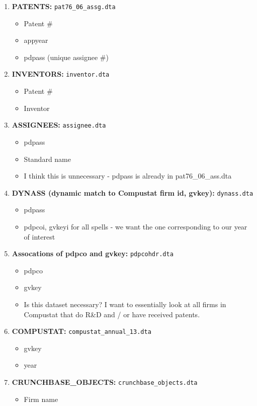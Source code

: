 \documentclass[12pt,english]{article}
\theoremstyle{remark}
\begin{document}
\begin{enumerate}
	\item \textbf{PATENTS:} \texttt{pat76\_06\_assg.dta}
	\begin{itemize}
		\item Patent \#
		\item appyear
		\item pdpass (unique assignee \#) 
	\end{itemize}
	\item \textbf{INVENTORS:} \texttt{inventor.dta}
	\begin{itemize}
		\item Patent \#
		\item Inventor
	\end{itemize}
	\item \textbf{ASSIGNEES:} \texttt{assignee.dta}
	\begin{itemize}
		\item pdpass
		\item Standard name
		\item I think this is unnecessary - pdpass is already in pat76\_06\_ass.dta
	\end{itemize}
	\item \textbf{DYNASS (dynamic match to Compustat firm id, gvkey):} \texttt{dynass.dta}
	\begin{itemize}
		\item pdpass
		\item pdpcoi, gvkeyi for all spells - we want the one corresponding to our year of interest
	\end{itemize}
	\item \textbf{Assocations of pdpco and gvkey:} \texttt{pdpcohdr.dta}
	\begin{itemize}
		\item pdpco
		\item gvkey
		\item Is this dataset necessary? I want to essentially look at all firms in Compustat that do R\&D and / or have received patents.
	\end{itemize}
	\item \textbf{COMPUSTAT:} \texttt{compustat\_annual\_13.dta}
	\begin{itemize}
		\item gvkey
		\item year
		\end{itemize}
	\item \textbf{CRUNCHBASE\_OBJECTS:} \texttt{crunchbase\_objects.dta}
	\begin{itemize}
		\item Firm name
	\end{itemize}
\end{enumerate}
\end{document}
